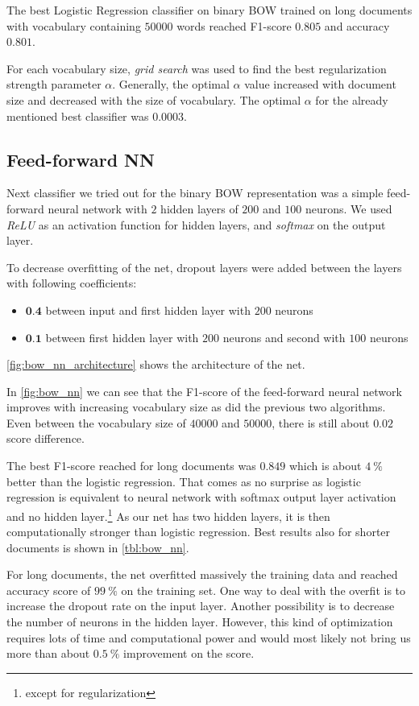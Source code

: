 The best Logistic Regression classifier on binary BOW trained on long documents with vocabulary containing $50000$ words reached F1-score $0.805$ and accuracy $0.801$.

For each vocabulary size, \textit{grid search} was used to find the best regularization strength parameter $\alpha$. Generally, the optimal $\alpha$ value increased with document size and decreased with the size of vocabulary. The optimal $\alpha$ for the already mentioned best classifier was $0.0003$.


\subsection{Feed-forward NN}
Next classifier we tried out for the binary BOW representation was a simple feed-forward neural network with $2$ hidden layers of $200$ and $100$ neurons. We used \textit{ReLU} as an activation function for hidden layers, and \textit{softmax} on the output layer.

To decrease overfitting of the net, dropout layers were added between the layers with following coefficients:
\begin{itemize}
  \item $\textbf{0.4}$ between input and first hidden layer with $200$ neurons
  \item $\textbf{0.1}$ between first hidden layer with $200$ neurons and second with $100$ neurons
\end{itemize}
\cref{fig:bow_nn_architecture} shows the architecture of the net.

In \cref{fig:bow_nn} we can see that the F1-score of the feed-forward neural network improves with increasing vocabulary size as did the previous two algorithms. Even between the vocabulary size of $40000$ and $50000$, there is still about $0.02$ score difference.

The best F1-score reached for long documents was $0.849$ which is about $4\ \%$ better than the logistic regression. That comes as no surprise as logistic regression is equivalent to neural network with softmax output layer activation and no hidden layer.\footnote{except for regularization} As our net has two hidden layers, it is then computationally stronger than logistic regression. Best results also for shorter documents is shown in \cref{tbl:bow_nn}.

For long documents, the net overfitted massively the training data and reached accuracy score of $99\ \%$ on the training set. One way to deal with the overfit is to increase the dropout rate on the input layer. Another possibility is to decrease the number of neurons in the hidden layer. However, this kind of optimization requires lots of time and computational power and would most likely not bring us more than about $0.5\ \%$ improvement on the score.


